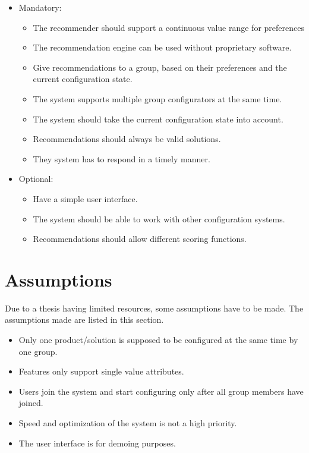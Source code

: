 \begin{itemize}
    \item Mandatory:
        \begin{itemize}
            \item The recommender should support a continuous value range for preferences
            \item The recommendation engine can be used without proprietary software.
            \item Give recommendations to a group, based on their preferences and the current configuration state.
            \item The system supports multiple group configurators at the same time.
            \item The system should take the current configuration state into account.

            \item Recommendations should always be valid solutions.
            \item They system has to respond in a timely manner.
        \end{itemize}
    \item Optional:
        \begin{itemize}
            \item Have a simple user interface.
            \item The system should be able to work with other configuration systems.
            \item Recommendations should allow different scoring functions.
        \end{itemize}
\end{itemize}


\section{Assumptions}
\label{sec:Concept:Assumptions}

Due to a thesis having limited resources, some assumptions have to be made. The assumptions made are listed in this section.

\begin{itemize}
    \item Only one product/solution is supposed to be configured at the same time by one group.
    \item Features only support single value attributes.
    \item Users join the system and start configuring only after all group members have joined.
    \item Speed and optimization of the system is not a high priority.
    \item The user interface is for demoing purposes.
\end{itemize}

